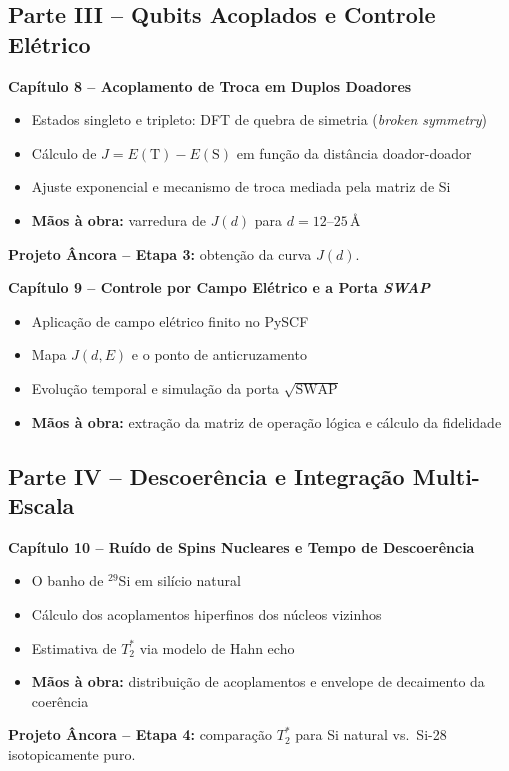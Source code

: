 \documentclass[12pt,a4paper]{article}
\begin{document}
	\subsection*{Parte III -- Qubits Acoplados e Controle Elétrico}
	
	\textbf{Capítulo 8 -- Acoplamento de Troca em Duplos Doadores}
	\begin{itemize}
		\item Estados singleto e tripleto: DFT de quebra de simetria (\emph{broken symmetry})
		\item Cálculo de $J = E(\text{T}) - E(\text{S})$ em função da distância doador-doador
		\item Ajuste exponencial e mecanismo de troca mediada pela matriz de Si
		\item \textbf{Mãos à obra:} varredura de $J(d)$ para $d = 12$--$25$\,\AA
	\end{itemize}
	\textbf{Projeto Âncora -- Etapa 3:} obtenção da curva $J(d)$.
	
	\textbf{Capítulo 9 -- Controle por Campo Elétrico e a Porta \emph{SWAP}}
	\begin{itemize}
		\item Aplicação de campo elétrico finito no PySCF
		\item Mapa $J(d, E)$ e o ponto de anticruzamento
		\item Evolução temporal e simulação da porta $\sqrt{\text{SWAP}}$
		\item \textbf{Mãos à obra:} extração da matriz de operação lógica e cálculo da fidelidade
	\end{itemize}
	
	\subsection*{Parte IV -- Descoerência e Integração Multi-Escala}
	
	\textbf{Capítulo 10 -- Ruído de Spins Nucleares e Tempo de Descoerência}
	\begin{itemize}
		\item O banho de $^{29}$Si em silício natural
		\item Cálculo dos acoplamentos hiperfinos dos núcleos vizinhos
		\item Estimativa de $T_2^*$ via modelo de Hahn echo
		\item \textbf{Mãos à obra:} distribuição de acoplamentos e envelope de decaimento da coerência
	\end{itemize}
	\textbf{Projeto Âncora -- Etapa 4:} comparação $T_2^*$ para Si natural vs.\ Si-28 isotopicamente puro.
	
\end{document}
